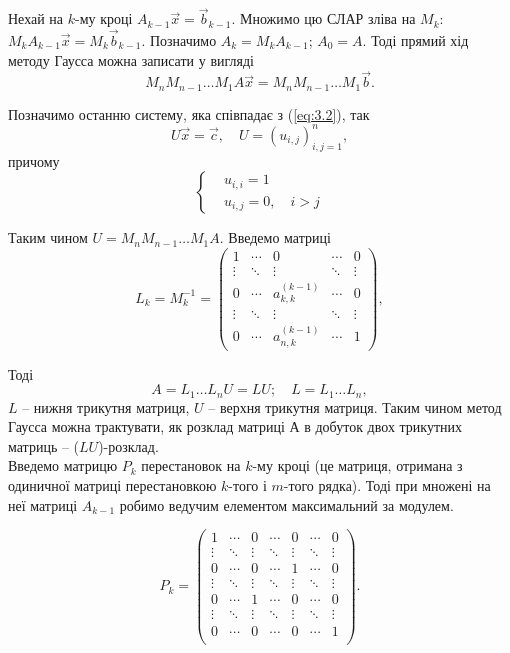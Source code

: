 Нехай на $k$-му кроці $A_{k-1}\vec x = \vec b_{k-1}$. Множимо цю СЛАР зліва на $M_k$: $M_k A_{k-1}\vec x = M_k \vec b_{k-1}$. Позначимо $A_k = M_k A_{k-1}$; $A_0 = A$. Тоді прямий хід методу Гаусса можна записати у вигляді \[ M_n M_{n-1} \ldots M_1 A \vec x = M_n M_{n-1} \ldots M_1 \vec b.\]

Позначимо останню систему, яка співпадає з (\ref{eq:3.2}), так 
\begin{equation}
	\label{eq:3.5}
	U \vec x = \vec c, \quad U = (u_{i,j})_{i,j=1}^n,
\end{equation}
причому \[ \left\{ \begin{aligned} & u_{i,i} = 1 \\ & u_{i,j} = 0, \quad i > j \end{aligned} \right.\]

Таким чином $U = M_n M_{n-1} \ldots M_1 A$. Введемо матриці
\[  L_k = M_k^{-1} = \begin{pmatrix} 1 & \cdots & 0 & \cdots & 0 \\ \vdots & \ddots & \vdots & \ddots & \vdots \\ 0 & \cdots & a_{k,k}^{(k-1)} & \cdots & 0 \\ \vdots & \ddots & \vdots & \ddots & \vdots \\ 0 & \cdots & a_{n,k}^{(k-1)} & \cdots & 1 \end{pmatrix}, \]

Тоді \[A = L_1\ldots L_n U = LU; \quad  L = L_1\ldots L_n, \]
$L$ -- нижня трикутня матриця, $U$ -- верхня трикутня матриця. Таким чином метод Гаусса можна трактувати, як розклад матриці $А$ в добуток двох трикутних матриць -- ($LU$)-розклад. \\

Введемо матрицю $P_k$ перестановок на $k$-му кроці (це матриця, отримана з одиничної матриці перестановкою $k$-того і $m$-того рядка). Тоді при множені на неї матриці $A_{k-1}$ робимо ведучим елементом максимальний за модулем.

\[ P_k = \begin{pmatrix} 1 & \cdots & 0 & \cdots & 0 & \cdots & 0 \\ \vdots & \ddots & \vdots & \ddots & \vdots & \ddots & \vdots \\ 0 & \cdots & 0 & \cdots & 1 & \cdots & 0 \\ \vdots & \ddots & \vdots & \ddots & \vdots & \ddots & \vdots \\ 0 & \cdots & 1 & \cdots & 0 & \cdots & 0 \\ \vdots & \ddots & \vdots & \ddots & \vdots & \ddots & \vdots \\ 0 & \cdots & 0 & \cdots & 0 & \cdots & 1 \\ \end{pmatrix}. \]

